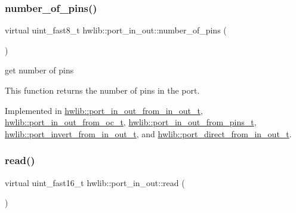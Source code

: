 \mbox{\label{classhwlib_1_1port__in__out_a44243a6c7664e734563f1809058751bc}} 
\subsubsection{\texorpdfstring{number\+\_\+of\+\_\+pins()}{number\_of\_pins()}}
{\footnotesize\ttfamily virtual uint\+\_\+fast8\+\_\+t hwlib\+::port\+\_\+in\+\_\+out\+::number\+\_\+of\+\_\+pins (\begin{DoxyParamCaption}{ }\end{DoxyParamCaption})\hspace{0.3cm}{\ttfamily [pure virtual]}}

get number of pins

This function returns the number of pins in the port. 

Implemented in \hyperlink{classhwlib_1_1port__in__out__from__in__out__t_a07646684024952afc6c166142f0d181b}{hwlib\+::port\+\_\+in\+\_\+out\+\_\+from\+\_\+in\+\_\+out\+\_\+t}, \hyperlink{classhwlib_1_1port__in__out__from__oc__t_a0dda97b4a90f2f63ed7c95f5b45f4d37}{hwlib\+::port\+\_\+in\+\_\+out\+\_\+from\+\_\+oc\+\_\+t}, \hyperlink{classhwlib_1_1port__in__out__from__pins__t_a06fa8cbc11dc64651e8214e4217b2453}{hwlib\+::port\+\_\+in\+\_\+out\+\_\+from\+\_\+pins\+\_\+t}, \hyperlink{classhwlib_1_1port__invert__from__in__out__t_a150f95f7fe2520298a139cfd58293923}{hwlib\+::port\+\_\+invert\+\_\+from\+\_\+in\+\_\+out\+\_\+t}, and \hyperlink{classhwlib_1_1port__direct__from__in__out__t_a7b9bed1806a7597e886404637d1fdf7e}{hwlib\+::port\+\_\+direct\+\_\+from\+\_\+in\+\_\+out\+\_\+t}.

\mbox{\label{classhwlib_1_1port__in__out_a5f6662d6fccd2b256d20722a4f3e5840}} 
\subsubsection{\texorpdfstring{read()}{read()}}
{\footnotesize\ttfamily virtual uint\+\_\+fast16\+\_\+t hwlib\+::port\+\_\+in\+\_\+out\+::read (\begin{DoxyParamCaption}{ }\end{DoxyParamCaption})\hspace{0.3cm}{\ttfamily [pure virtual]}}


